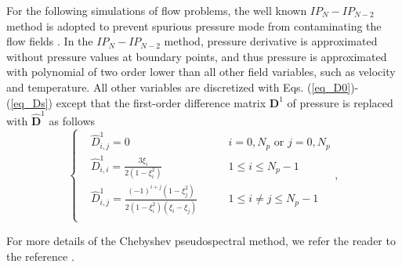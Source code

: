 \documentclass[preprint, 10pt]{elsarticle}
\begin{document}
For the following simulations of flow problems, the well known $IP_N-IP_{N-2}$ method \cite{zhang2010explicit} is adopted to prevent spurious pressure mode from
contaminating the flow fields \cite{peyret2013spectral}. In the $IP_N-IP_{N-2}$ method, pressure derivative is approximated without pressure values at boundary points, and thus pressure is approximated with polynomial of two order lower than all other field variables, such as velocity and temperature. All other variables are discretized with Eqs. (\ref{eq_D0})-(\ref{eq_Ds}) except that the first-order difference matrix $\mathbf{D}^{1}$ of pressure is replaced with $\hat {\mathbf{D}}^1$ as follows
\begin{equation}
\left\{ \begin{aligned}
&\hat D_{i,j}^1 = 0                              & i=0,N_p \text{  or } j=0, N_p \\
&\hat D_{i,i}^1 = \frac{3\xi_i}{2(1-\xi_i^{2})}  & 1 \le i \le N_p-1\\
&\hat D_{i,j}^1 = \frac{(-1)^{i+j}(1-\xi_j^{2})}
{2(1-\xi_i^{2})(\xi_i-\xi_j)} \qquad             & 1 \le i \ne j \le N_p-1\\
\end{aligned} \right. ,
\label{eq_D1}
\end{equation}


For more details of the Chebyshev pseudospectral method, we refer the reader to the reference \cite{peyret2013spectral, chen2018multidomain, chen2020parallel}.
\end{document}
